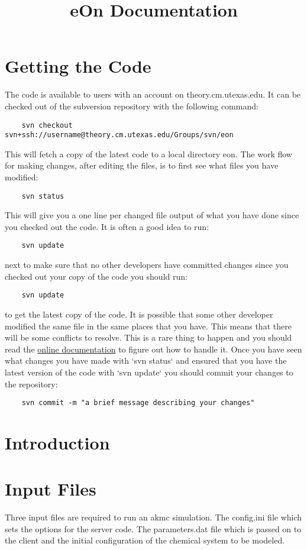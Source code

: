 \documentclass{article}
\begin{document}
\title{eOn Documentation}
\maketitle
\section{Getting the Code}
The code is available to users with an account on theory.cm.utexas.edu. It can
be checked out of the subversion repository with the following command:
\begin{verbatim}
    svn checkout svn+ssh://username@theory.cm.utexas.edu/Groups/svn/eon
\end{verbatim}
This will fetch a copy of the latest code to a local directory eon.
The work flow for making changes, after editing the files, is to first see what
files you have modified:
\begin{verbatim}
    svn status
\end{verbatim}
This will give you a one line per changed file output of what you have done
since you checked out the code. It is often a good idea to run:
\begin{verbatim}
    svn update
\end{verbatim}
next to make sure that no other developers have committed changes since you
checked out your copy of the code you should run:
\begin{verbatim}
    svn update
\end{verbatim}
to get the latest copy of the code. It is possible that some other developer
modified the same file in the same places that you have. This means that there
will be some conflicts to resolve. This is a rare thing to happen and you
should read the \href{http://svnbook.red-bean.com/en/1.5/index.html}{online documentation} to figure out how to handle it. Once you have seen what changes you have made with `svn status` and ensured that you have the latest version of the code with `svn update` you should commit your changes to the repository:
\begin{verbatim}
    svn commit -m "a brief message describing your changes"
\end{verbatim}

\section{Introduction}

\section{Input Files}
Three input files are required to run an akmc simulation. The config.ini file
which sets the options for the server code. The parameters.dat file which is
passed on to the client and the initial configuration of the chemical system to
be modeled.
\end{document}
